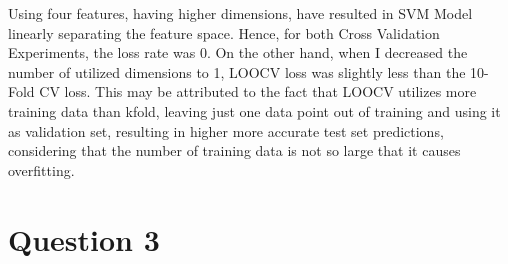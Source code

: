 \documentclass[11pt]{extarticle}
\begin{document}
Using four features, having higher dimensions, have resulted in SVM Model linearly separating the feature space. Hence,
for both Cross Validation Experiments, the loss rate was 0. On the other hand, when I decreased the number of utilized dimensions
to 1, LOOCV loss was slightly less than the 10-Fold CV loss. This may be attributed to the fact that LOOCV utilizes
more training data than kfold, leaving just one data point out of training and using it as validation set, resulting in higher more accurate test set predictions, considering that the
number of training data is not so large that it causes overfitting.

\section{Question 3}
\end{document}
